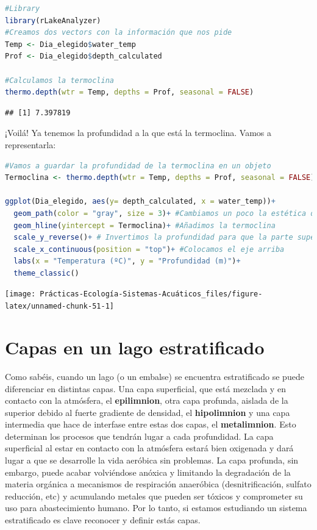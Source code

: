 \documentclass[
]{book}
\begin{document}
\begin{lstlisting}[language=R]
#Library
library(rLakeAnalyzer)
#Creamos dos vectors con la información que nos pide
Temp <- Dia_elegido$water_temp
Prof <- Dia_elegido$depth_calculated

#Calculamos la termoclina
thermo.depth(wtr = Temp, depths = Prof, seasonal = FALSE)
\end{lstlisting}

\begin{lstlisting}
## [1] 7.397819
\end{lstlisting}

¡Voilá! Ya tenemos la profundidad a la que está la termoclina. Vamos a representarla:

\begin{lstlisting}[language=R]
#Vamos a guardar la profundidad de la termoclina en un objeto
Termoclina <- thermo.depth(wtr = Temp, depths = Prof, seasonal = FALSE)

ggplot(Dia_elegido, aes(y= depth_calculated, x = water_temp))+
  geom_path(color = "gray", size = 3)+ #Cambiamos un poco la estética dándole color y grosor a la línea
  geom_hline(yintercept = Termoclina)+ #Añadimos la termoclina
  scale_y_reverse()+ # Invertimos la profundidad para que la parte superior sea 0 metros.
  scale_x_continuous(position = "top")+ #Colocamos el eje arriba
  labs(x = "Temperatura (ºC)", y = "Profundidad (m)")+
  theme_classic()
\end{lstlisting}

\texttt{[image: Prácticas-Ecología-Sistemas-Acuáticos\_files/figure-latex/unnamed-chunk-51-1]}

\hypertarget{capas-en-un-lago-estratificado}{%
\section{Capas en un lago estratificado}\label{capas-en-un-lago-estratificado}}

Como sabéis, cuando un lago (o un embalse) se encuentra estratificado se puede diferenciar en distintas capas. Una capa superficial, que está mezclada y en contacto con la atmósfera, el \textbf{epilimnion}, otra capa profunda, aislada de la superior debido al fuerte gradiente de densidad, el \textbf{hipolimnion} y una capa intermedia que hace de interfase entre estas dos capas, el \textbf{metalimnion}. Esto determinan los procesos que tendrán lugar a cada profundidad. La capa superficial al estar en contacto con la atmósfera estará bien oxigenada y dará lugar a que se desarrolle la vida aeróbica sin problemas. La capa profunda, sin embargo, puede acabar volviéndose anóxica y limitando la degradación de la materia orgánica a mecanismos de respiración anaeróbica (desnitrificación, sulfato reducción, etc) y acumulando metales que pueden ser tóxicos y comprometer su uso para abastecimiento humano. Por lo tanto, si estamos estudiando un sistema estratificado es clave reconocer y definir estás capas.
\end{document}
